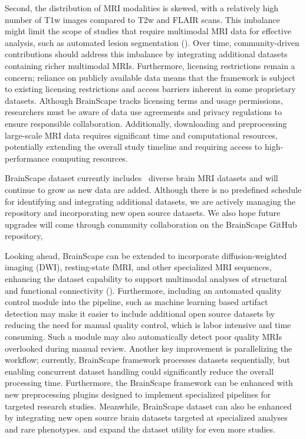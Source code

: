 Second, the distribution of MRI modalities is skewed, with a relatively high number of T1w images compared to T2w and FLAIR scans. 
This imbalance might limit the scope of studies that require multimodal MRI data for effective analysis, such as automated lesion segmentation (\cite{menze2014multimodal, spitzer2022interpretable}). 
Over time, community-driven contributions should address this imbalance by integrating additional datasets containing richer multimodal MRIs. 
Furthermore, licensing restrictions remain a concern; reliance on publicly available data means that the framework is subject to existing licensing restrictions 
and access barriers inherent in some proprietary datasets.
Although BrainScape tracks licensing terms and usage permissions, researchers must be aware of 
data use agreements and privacy regulations to ensure responsible collaboration. 
Additionally, downloading and preprocessing large-scale MRI data requires significant time and computational resources, 
potentially extending the overall study timeline and requiring access to high-performance computing resources.

BrainScape dataset currently includes \NumDatasets\ diverse brain MRI datasets and will continue to grow as new data are added. 
Although there is no predefined schedule for identifying and integrating additional datasets, 
we are actively managing the repository and incorporating new open source datasets. 
We also hope future upgrades will come through community collaboration on the BrainScape GitHub repository, 

Looking ahead, BrainScape can be extended to incorporate diffusion-weighted imaging (DWI), resting-state fMRI, 
and other specialized MRI sequences, enhancing the dataset capability to support multimodal analyses 
of structural and functional connectivity (\cite{van2013wu}). 
Furthermore, including an automated quality control module into the pipeline, such as machine learning based artifact detection 
may make it easier to include additional open source datasets by reducing the need for manual quality control, which is labor intensive and time consuming. 
Such a module may also automatically detect poor quality MRIs overlooked during manual review. 
Another key improvement is parallelizing the workflow; currently, BrainScape framework processes datasets sequentially, 
but enabling concurrent dataset handling could significantly reduce the overall processing time. 
Furthermore, the BrainScape framework can be enhanced with new preprocessing plugins designed to implement specialized pipelines for targeted research studies.
Meanwhile, BrainScape dataset can also be enhanced by integrating new open source brain datasets 
targeted at specialized analyses and rare phenotypes.
and expand the dataset utility for even more studies. 

